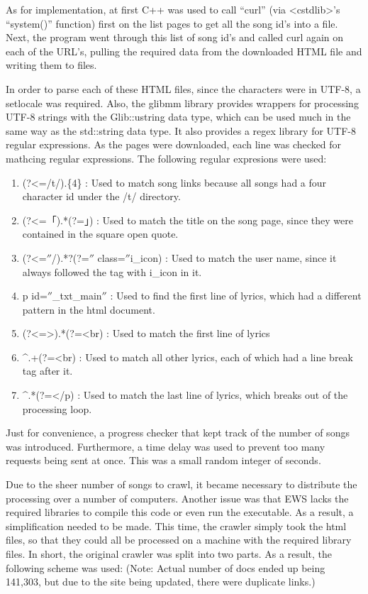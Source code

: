 \documentclass{acm} %
\begin{document}
\begin{CJK}{UTF8}{zhsong}
As for implementation, at first C++ was used to call ``curl'' (via <cstdlib>'s ``system()'' function) first on the list pages to get all the song id's into a file. Next, the program went through this list of song id's and called curl again on each of the URL's, pulling the required data from the downloaded HTML file and writing them to files.

In order to parse each of these HTML files, since the characters were in UTF-8, a setlocale was required. Also, the glibmm library provides wrappers for processing UTF-8 strings with the Glib::ustring data type, which can be used much in the same way as the std::string data type. It also provides a regex library for UTF-8 regular expressions. As the pages were downloaded, each line was checked for mathcing regular expressions. The following regular expresions were used:

\begin{enumerate}
 \item (?<=/t/).\{4\} : Used to match song links because all songs had a four character id under the /t/ directory.
 \item (?<=「).*(?=」) : Used to match the title on the song page, since they were contained in the square open quote.
 \item (?<=$''$/).*?(?=$''$ class=$''$i\_icon) : Used to match the user name, since it always followed the tag with i\_icon in it.
 \item p id=$''$\_txt\_main$''$ : Used to find the first line of lyrics, which had a different pattern in the html document.
 \item (?<=>).*(?=<br) : Used to match the first line of lyrics
 \item \^{}.+(?=<br) : Used to match all other lyrics, each of which had a line break tag after it.
 \item \^{}.*(?=</p) : Used to match the last line of lyrics, which breaks out of the processing loop.
\end{enumerate}

Just for convenience, a progress checker that kept track of the number of songs was introduced. Furthermore, a time delay was used to prevent too many requests being sent at once. This was a small random integer of seconds.

Due to the sheer number of songs to crawl, it became necessary to distribute the processing over a number of computers. Another issue was that EWS lacks the required libraries to compile this code or even run the executable. As a result, a simplification needed to be made. This time, the crawler simply took the html files, so that they could all be processed on a machine with the required library files. In short, the original crawler was split into two parts. As a result, the following scheme was used: (Note: Actual number of docs ended up being 141,303, but due to the site being updated, there were duplicate links.)


\end{CJK}
\end{document}
